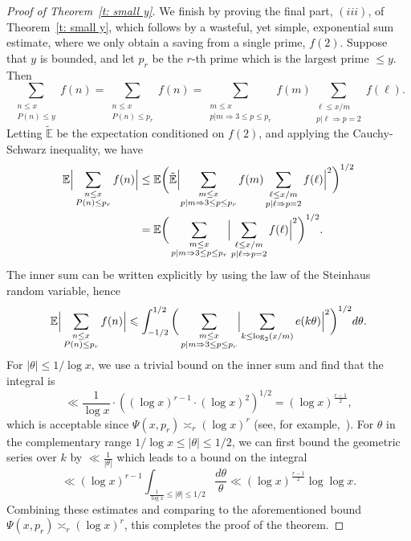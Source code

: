 \documentclass[12pt,a4paper,reqno]{amsart}
\numberwithin{equation}{section}
\def\E{\mathbb E}
\def\p {\mathbbm{1}_{\wp}}
\def\leq {\leqslant}
\theoremstyle{remark}
\theoremstyle{definition}
\numberwithin{equation}{section}
\theoremstyle{remark}
\def\E{\mathbb E}
\begin{document}
\begin{proof}[Proof of Theorem~\ref{t: small y}]
We finish by proving the final part, $(iii)$, of Theorem~\ref{t: small y}, which follows by a wasteful, yet simple, exponential sum estimate, where we only obtain a saving from a single prime, $f(2)$. Suppose that $y$ is bounded, and let $p_r$ be the $r$-th prime which is the largest prime $\le y$. Then
\[
\sum_{\substack{n \leq x \\ P(n) \leq y}} f(n) = \sum_{\substack{n\le x\\ P(n)\le p_r}} f(n)  =  \sum_{\substack{m\le x \\ p|m \Rightarrow 3\le p \le p_r}} f(m) \sum_{\substack{\ell\le x/m \\p|\ell \Rightarrow p=2 }} f(\ell). 
\]
Letting $\tilde{\E}$ be the expectation conditioned on $f(2)$, and applying the Cauchy-Schwarz inequality, we have
\begin{align*}
\E\Big|\sum_{\substack{n\le x\\ P(n)\le p_r}} f(n)\Big| &\le \E \biggl( \tilde{\E} \Bigl| \sum_{\substack{m\le x \\ p|m \Rightarrow 3\le p \le p_r}} f(m) \sum_{\substack{\ell\le x/m \\p|\ell \Rightarrow p=2 }} f(\ell) \Bigr|^2 \biggr)^{1/2}  \\ 
&= \E \bigg(\sum_{\substack{m\le x \\ p|m \Rightarrow 3\le p \le p_r}} \Bigl| \sum_{\substack{\ell\le x/m \\p|\ell \Rightarrow p=2 }} f(\ell) \Bigr|^{2}\bigg)^{1/2}.
\end{align*}
The inner sum can be written explicitly by using the law of the Steinhaus random variable, hence
\[ 
\E\Big|\sum_{\substack{n\le x\\ P(n)\le p_r}} f(n)\Big| \leq \int_{-1/2}^{1/2}\bigg(\sum_{\substack{m\le x \\ p|m \Rightarrow 3\le p \le p_r}} \Bigl| \sum_{\substack{k\le \log_2 (x/m) }} e(k\theta) \Bigr|^{2}\bigg)^{1/2} d\theta.
\]
For $|\theta| \leq 1/\log x$, we use a trivial bound on the inner sum and find that the integral is 
\[\ll \frac{1}{\log x } \cdot ((\log x)^{r-1} \cdot (\log x)^{2})^{1/2} = (\log x)^{\frac{r-1}{2}},\]
which is acceptable since $\Psi(x, p_r) \asymp_r (\log x)^{r}$ (see, for example,~\cite[Theorem~1]{Ennola}). For $\theta$ in the complementary range $1/\log x \leq |\theta| \leq 1/2$, we can first bound the geometric series over $k$ by $\ll \frac{1}{|\theta|}$ which leads to a bound on the integral
\[\ll (\log x)^{r-1} \int_{\frac{1}{\log x} \leq |\theta| \leq 1/2 } \frac{d\theta}{\theta}  \ll (\log x)^{\frac{r-1}{2}} \log \log x.  \]
Combining these estimates and comparing to the aforementioned bound $\Psi(x, p_r) \asymp_r (\log x)^{r}$, this completes the proof of the theorem.  
\end{proof}
\end{document}

